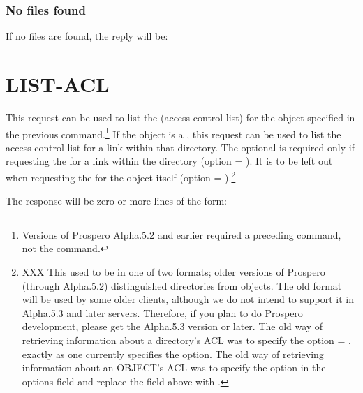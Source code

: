 \subsubsection{No files found}

If no files are found, the reply will be:

\begin{command}
\end{command}

\section{LIST-ACL}

\begin{command}
\commandsize
{}  \zoos{}\zooe\selectlines
\end{command}

This request can be used to list the  (access control list) for
the object specified in the previous 
command.\footnote{Versions of Prospero Alpha.5.2 and earlier
required a preceding  command,  not the 
command.}
If the
object is a
, this request can be used to list the access control list
for a link within that directory.
The optional  is required only if requesting the
 for a link within the directory (option = ).  It
is to be left out when requesting the  for the object itself
(option = ).\footnote{XXX This used to be in one of two
formats; older versions of Prospero (through Alpha.5.2) distinguished
directories from objects.  The old format will be used by some older
clients, although we do not intend to support it in Alpha.5.3 and
later servers.  Therefore, if you plan to do Prospero
development, please get the Alpha.5.3 version or later.
The old way of retrieving information about a directory's ACL was to
specify the option = , exactly as one currently
specifies the  option.
The old way of retrieving information about an OBJECT's ACL was to
specify the  option in the options field and replace the  field
above with   \zoos{}\zooe.}

The response will be zero or more lines of the form:

\begin{command}
    \zoos{} 
	\zoos{} \zoms{}\zome\zooe\zooe
\end{command}

